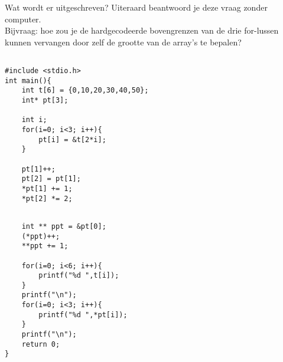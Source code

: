 \beginoef
Wat wordt er uitgeschreven? Uiteraard beantwoord je deze vraag zonder computer. 
\\Bijvraag: hoe zou je de hardgecodeerde bovengrenzen van de drie for-lussen kunnen 
vervangen door zelf de grootte van de array's te bepalen? 

\begin{footnotesize}
\begin{minipage}{8cm}
\begin{verbatim}

#include <stdio.h>
int main(){
    int t[6] = {0,10,20,30,40,50};
    int* pt[3];
	
    int i;
    for(i=0; i<3; i++){
        pt[i] = &t[2*i];	
    }
	
    pt[1]++;
    pt[2] = pt[1];
    *pt[1] += 1;
    *pt[2] *= 2;
\end{verbatim}
\end{minipage}
\begin{minipage}{8cm}
\begin{verbatim}
	
    int ** ppt = &pt[0];
    (*ppt)++;          
    **ppt += 1;
		
    for(i=0; i<6; i++){
        printf("%d ",t[i]);
    }
    printf("\n");
    for(i=0; i<3; i++){
        printf("%d ",*pt[i]);	
    }    
    printf("\n");
    return 0;
}
\end{verbatim}
\end{minipage}
\end{footnotesize}
\endoef
